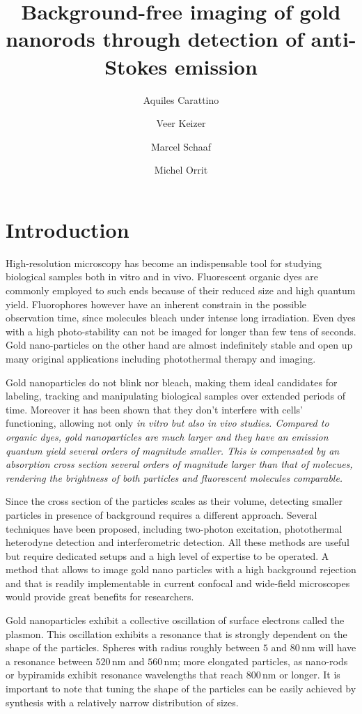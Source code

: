 \documentclass[journal=nalefd,manuscript=letter]{achemso}
\author{Aquiles Carattino}
\affiliation[Leiden]
{Huygens-Kamerlingh Onnes, Leiden, The Netherlands}
\author{Veer Keizer}
\affiliation[Leiden]
{Huygens-Kamerlingh Onnes, Leiden, The Netherlands}
\author{Marcel Schaaf}
\affiliation[Leiden]
{Huygens-Kamerlingh Onnes, Leiden, The Netherlands}
\author{Michel Orrit}
\affiliation[Leiden]
{Huygens-Kamerlingh Onnes, Leiden, The Netherlands}
\title{Background-free imaging of gold nanorods through detection of
anti-Stokes emission}
\newcommand{\nm}{\ensuremath{\,\textrm{nm}}}
\begin{document}
\maketitle
{}
\section{Introduction}
High-resolution microscopy has become an indispensable tool for studying
biological samples both in vitro and in vivo\cite{Moerner2007}.
Fluorescent organic dyes are commonly employed to such ends because of their
reduced size and high quantum yield. Fluorophores however have an inherent
constrain in the possible observation time, since molecules bleach under intense
long irradiation. Even dyes with a high photo-stability can not be imaged for
longer than few tens of seconds. Gold nano-particles on the other hand are
almost indefinitely stable and open up many original applications including
photothermal therapy and imaging.

Gold nanoparticles do not blink nor bleach, making them ideal candidates for
labeling, tracking and manipulating biological samples over extended periods of
time. Moreover it has been shown that they don't interfere with cells'
functioning, allowing not only \em{in vitro} but also \em{in vivo} studies.
Compared to organic dyes, gold nanoparticles are much larger and they have an
emission quantum yield several orders of magnitude smaller. This is compensated
by an absorption cross section several orders of magnitude larger than that of
molecues, rendering the brightness of both particles and fluorescent molecules
comparable.

Since the cross section of the particles scales as their volume, detecting
smaller particles in presence of background requires a different approach.
Several techniques have been proposed, including two-photon
excitation\cite{VandenBroek2013}, photothermal heterodyne
detection\cite{Berciaud2006} and interferometric detection\cite{Ignatovich2006}.
All these methods are useful but require dedicated setups and a high level of
expertise to be operated. A method that allows to image gold nano particles with
a high background rejection and that is readily implementable in current
confocal and wide-field microscopes would provide great benefits for
researchers.

Gold nanoparticles exhibit a collective oscillation of surface electrons called
the plasmon. This oscillation exhibits a resonance that is strongly dependent on
the shape of the particles. Spheres with radius roughly between $5$ and $80\nm$
will have a resonance between $520\nm$ and $560\nm$; more elongated particles,
as nano-rods or bypiramids exhibit resonance wavelengths that reach $800\nm$ or
longer. It is important to note that tuning the shape of the particles can be
easily achieved by synthesis with a relatively narrow distribution of sizes.
\end{document}
